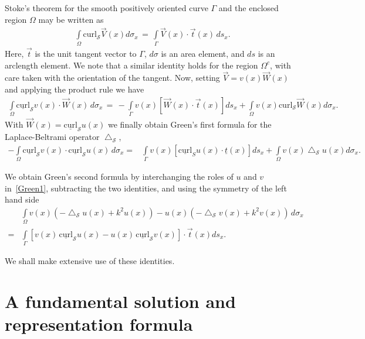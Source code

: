 \documentclass[final]{siamltex}
\newcommand{\lap}{\bigtriangleup}
\renewcommand{\S} {\mathcal{S}}
\begin{document}
Stoke's theorem for the  smooth positively oriented curve $\Gamma$ and the enclosed region
$\Omega$ may be written  as
\begin{align*}
\int\limits_{\Omega} \mbox{curl}_{\S} \vec{V}(x) d\sigma_x \, = \,
\int\limits_\Gamma \vec{V}(x) \cdot \vec{t}(x) \, ds_x .
\end{align*}
Here, $\vec{t}$ is the unit tangent vector to $\Gamma$, $d\sigma$ is an
area element, and $ds$ is an arclength element. We note that a similar
identity holds for the region $\Omega^{c}$, with care taken with the
orientation of the tangent.  Now, setting $\vec{V} = v(x) \vec{W}(x)$
and applying the product rule we have
\begin{align*}
\int\limits_{\Omega} \underline{\mbox{curl}}_{\S} v(x) \cdot
\vec{W}(x) \, d\sigma_x \, = \, 
-\int\limits_{\Gamma} v(x) [\vec{W}(x) \cdot \vec{t}(x)] ds_x +
\int\limits_{\Omega} v(x) \mbox{curl}_{\S} \vec{W}(x) d\sigma_x .
\end{align*}
With $\vec{W}(x) = \underline{\mbox{curl}}_{\S} u(x)$ we finally
obtain Green's first formula for the Laplace-Beltrami operator
$\lap_{\S}$,
\begin{align}
  \label{Green1}
  -\int\limits_{\Omega} \underline{\mbox{curl}}_{\S} v(x) \cdot
  \underline{\mbox{curl}}_{\S} u(x) \, d\sigma_x 
  =& \int\limits_{\Gamma} v(x) [\underline{\mbox{curl}}_S u(x) \cdot 
  \underline{t}(x)] ds_x +\int\limits_{\Omega} v(x) \lap_{\S}u(x) d\sigma_x.
\end{align}

We obtain Green's second formula by interchanging the roles of $u$ and
$v$ in~\eqref{Green1}, subtracting the two identities, and using the
symmetry of the left hand side
\begin{align}
&\int\limits_{\Omega} v(x)(-\lap_{\S}u(x) +k^2 u(x))-
u(x)(-\lap_{\S}v(x) +k^2v(x))\, d\sigma_x \nonumber \\
=&\int\limits_\Gamma [v(x)\,\underline{\mbox{curl}}_{\S} u(x) - u(x)\, \underline{\mbox{curl}}_{\S}v(x)]\cdot \vec{t}(x) ds_x. \label{Green2}
\end{align}

We shall make extensive use of these identities.





\section{A fundamental solution and representation formula}
\end{document}

